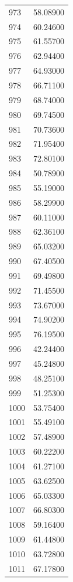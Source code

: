 \documentclass[
  letterpaper,
  DIV=11,
  numbers=noendperiod]{scrreprt}
\begin{document}
\begin{tcolorbox}
\begin{tabular}{lr}
973  &         58.08900 \\
974  &         60.24600 \\
975  &         61.55700 \\
976  &         62.94400 \\
977  &         64.93000 \\
978  &         66.71100 \\
979  &         68.74000 \\
980  &         69.74500 \\
981  &         70.73600 \\
982  &         71.95400 \\
983  &         72.80100 \\
984  &         50.78900 \\
985  &         55.19000 \\
986  &         58.29900 \\
987  &         60.11000 \\
988  &         62.36100 \\
989  &         65.03200 \\
990  &         67.40500 \\
991  &         69.49800 \\
992  &         71.45500 \\
993  &         73.67000 \\
994  &         74.90200 \\
995  &         76.19500 \\
996  &         42.24400 \\
997  &         45.24800 \\
998  &         48.25100 \\
999  &         51.25300 \\
1000 &         53.75400 \\
1001 &         55.49100 \\
1002 &         57.48900 \\
1003 &         60.22200 \\
1004 &         61.27100 \\
1005 &         63.62500 \\
1006 &         65.03300 \\
1007 &         66.80300 \\
1008 &         59.16400 \\
1009 &         61.44800 \\
1010 &         63.72800 \\
1011 &         67.17800 \\

\end{tabular}
\end{tcolorbox}
\end{document}
